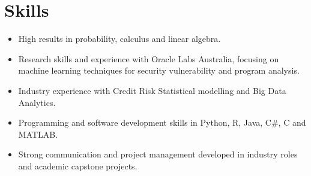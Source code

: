 \section*{Skills}

\begin{itemize}
    \setlength\itemsep{0.1em}
    \item High results in probability, calculus and linear algebra.
    \item Research skills and experience with Oracle Labs Australia, focusing on machine learning techniques for security vulnerability and program analysis.
    \item Industry experience with Credit Risk Statistical modelling and Big Data Analytics.
    \item Programming and software development skills in Python, R, Java, C\#, C and MATLAB.
    \item Strong communication and project management developed in industry roles and academic capstone projects.
\end{itemize}